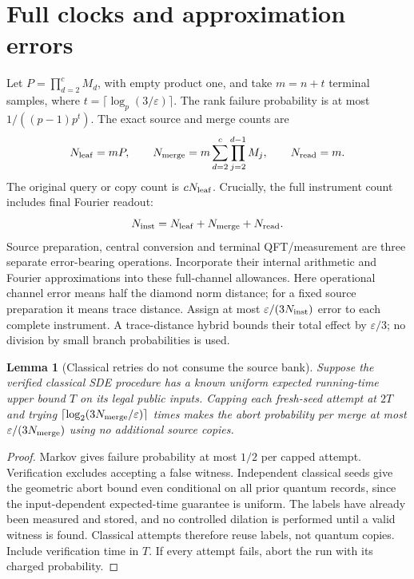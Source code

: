 \documentclass[11pt]{article}
\newtheorem{lemma}[theorem]{Lemma}
\theoremstyle{remark}
\newcommand{\eps}{\varepsilon}
\begin{document}
\section{Full clocks and approximation errors}
Let $P=\prod_{d=2}^cM_d$, with empty product one, and take $m=n+t$
terminal samples, where $t=\lceil\log_p(3/\eps)\rceil$.
The rank failure probability is at most $1/((p-1)p^t)$.
The exact source and merge counts are
\[
 N_{\rm leaf}=mP,\qquad
 N_{\rm merge}=m\sum_{d=2}^c\prod_{j=2}^{d-1}M_j,
 \qquad N_{\rm read}=m.
\]
The original query or copy count is $cN_{\rm leaf}$.
Crucially, the full instrument count includes final Fourier readout:
\[
 N_{\rm inst}=N_{\rm leaf}+N_{\rm merge}+N_{\rm read}.
\]
Source preparation, central conversion and terminal QFT/measurement are
three separate error-bearing operations. Incorporate their internal
arithmetic and Fourier approximations into these full-channel allowances.
Here operational channel error means half the diamond norm distance;
for a fixed source preparation it means trace distance. Assign at most
$\eps/(3N_{\rm inst})$ error to each complete instrument.
A trace-distance hybrid bounds their total effect by $\eps/3$; no division
by small branch probabilities is used.

\begin{lemma}[Classical retries do not consume the source bank]
Suppose the verified classical SDE procedure has a known uniform expected
running-time upper bound $T$ on its legal public inputs. Capping each
fresh-seed attempt at $2T$ and trying
$\lceil\log_2(3N_{\rm merge}/\eps)\rceil$ times makes the abort probability
per merge at most $\eps/(3N_{\rm merge})$ using no additional source copies.
\end{lemma}
\begin{proof}
Markov gives failure probability at most $1/2$ per capped attempt.
Verification excludes accepting a false witness. Independent classical
seeds give the geometric abort bound even conditional on all prior quantum
records, since the input-dependent expected-time guarantee is uniform.
The labels have already been measured and stored, and no controlled
dilation is performed until a valid witness is found. Classical attempts
therefore reuse labels, not quantum copies. Include verification time in
$T$. If every attempt fails, abort the run with its charged probability.
\end{proof}
\end{document}
